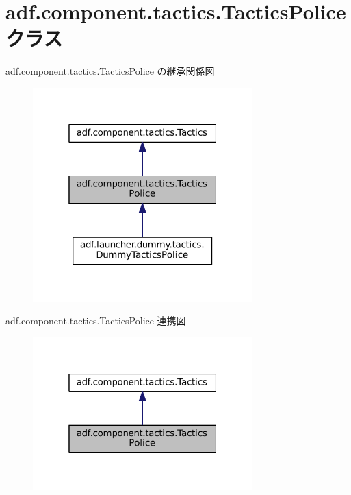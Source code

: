 \hypertarget{classadf_1_1component_1_1tactics_1_1TacticsPolice}{}\section{adf.\+component.\+tactics.\+Tactics\+Police クラス}
\label{classadf_1_1component_1_1tactics_1_1TacticsPolice}


adf.\+component.\+tactics.\+Tactics\+Police の継承関係図
\nopagebreak
\begin{figure}[H]
\begin{center}
\leavevmode
\includegraphics[width=241pt]{classadf_1_1component_1_1tactics_1_1TacticsPolice__inherit__graph}
\end{center}
\end{figure}


adf.\+component.\+tactics.\+Tactics\+Police 連携図
\nopagebreak
\begin{figure}[H]
\begin{center}
\leavevmode
\includegraphics[width=241pt]{classadf_1_1component_1_1tactics_1_1TacticsPolice__coll__graph}
\end{center}
\end{figure}
